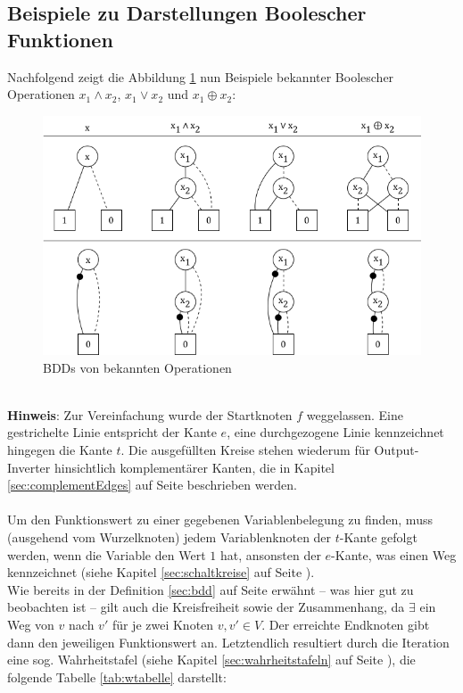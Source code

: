 \subsection{Beispiele zu Darstellungen Boolescher Funktionen}
\label{sec:beispiele}
Nachfolgend zeigt die Abbildung \ref{fig:operations} nun Beispiele bekannter Boolescher Operationen $x_1 \wedge x_2$, $x_1 \vee x_2$ und $x_1 \oplus x_2$:
\begin{figure}[bth]
	\centering
	\includegraphics[scale=0.6]{./img/bdds}
	\caption[BDDs von bekannten Operationen]{BDDs von bekannten Operationen}
	\label{fig:operations}
\end{figure}\\
\textbf{Hinweis}: Zur Vereinfachung wurde der Startknoten $f$ weggelassen. Eine gestrichelte Linie entspricht der Kante $e$, eine durchgezogene Linie kennzeichnet hingegen die Kante $t$. Die ausgefüllten Kreise stehen wiederum für Output-Inverter hinsichtlich komplementärer Kanten, die in Kapitel \ref{sec:complementEdges} auf Seite \pageref{sec:complementEdges} beschrieben werden.\\
\\Um den Funktionswert zu einer gegebenen Variablenbelegung zu finden, muss (ausgehend vom Wurzelknoten) jedem Variablenknoten der $t$-Kante gefolgt werden, wenn die Variable den Wert $1$ hat, ansonsten der $e$-Kante, was einen Weg kennzeichnet (siehe Kapitel \ref{sec:schaltkreise} auf Seite \pageref{sec:schaltkreise}).\\
Wie bereits in der Definition \ref{sec:bdd} auf Seite \pageref{sec:bdd} erwähnt -- was hier gut zu beobachten ist -- gilt auch die Kreisfreiheit sowie der Zusammenhang, da $\exists$ ein Weg von $v$ nach $v'$ für je zwei Knoten $v, v' \in V$. Der erreichte Endknoten gibt dann den jeweiligen Funktionswert an. Letztendlich resultiert durch die Iteration eine sog. Wahrheitstafel (siehe Kapitel \ref{sec:wahrheitstafeln} auf Seite \pageref{sec:wahrheitstafeln}), die folgende Tabelle \ref{tab:wtabelle} darstellt:
